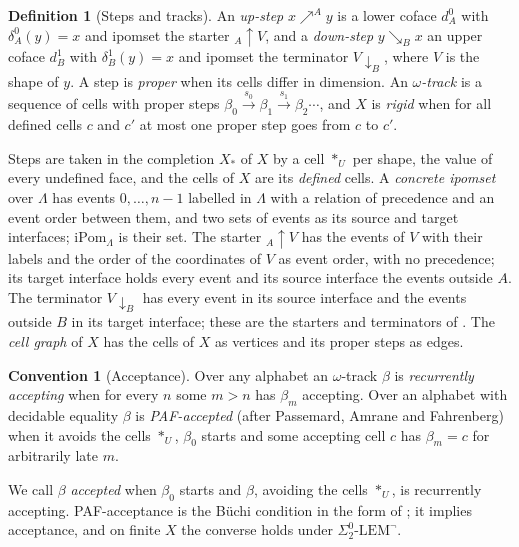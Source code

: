 \documentclass{lmcs}
\theoremstyle{definition}
\newtheorem{definition}[theorem]{Definition}
\newtheorem{convention}[theorem]{Convention}
\theoremstyle{remark}
\newcommand{\arrO}[1]{\mathrel{\nearrow^{#1}}}
\newcommand{\arrI}[1]{\mathrel{\searrow_{#1}}}
\newcommand{\starter}[2]{{}_{#2}{\uparrow}{#1}}
\newcommand{\terminator}[2]{{#1}{\downarrow}_{#2}}%
\newcommand{\Ipom}{\mathrm{iPom}}
\newcommand{\prin}[1]{\mathrm{#1}}
\newcommand{\EIO}{\Sigma^0_2\text{-}\prin{LEM}^{\neg}}
\begin{document}
\begin{definition}[Steps and tracks]\label{def:track}
An \emph{up-step} $x\arrO{A}y$ is a lower coface $d^0_A$ with $\delta^0_A(y)=x$ and ipomset the starter
$\starter{V}{A}$, and a \emph{down-step} $y\arrI{B}x$ an upper coface $d^1_B$ with $\delta^1_B(y)=x$ and
ipomset the terminator $\terminator{V}{B}$, where $V$ is the shape of $y$. A step is \emph{proper} when its
cells differ in dimension. An \emph{$\omega$-track} is a sequence of cells with proper steps
$\beta_0\xrightarrow{s_0}\beta_1\xrightarrow{s_1}\beta_2\cdots$, and $X$ is \emph{rigid} when for all defined cells $c$
and $c'$ at most one proper step goes from $c$ to $c'$.
\end{definition}

Steps are taken in the completion $X_\ast$ of $X$ by a cell $\ast_U$ per shape, the value of every undefined
face, and the cells of $X$ are its \emph{defined} cells. A \emph{concrete ipomset} over $\Lambda$ has events
$0,\dots,n-1$ labelled in $\Lambda$ with a relation of precedence and an event order between them, and two sets of
events as its source and target interfaces; $\Ipom_\Lambda$ is their set. The starter
$\starter{V}{A}$ has the events of $V$ with their labels and the order of the coordinates of $V$ as event order,
with no precedence; its target interface holds every event and its source interface the events outside
$A$. The terminator $\terminator{V}{B}$ has every event in its source interface and
the events outside $B$ in its target interface; these are the starters and
terminators of \cite{FJSZ21,PAF25}.
The \emph{cell graph} of $X$ has the
cells of $X$ as vertices and its proper steps as edges.

\begin{convention}[Acceptance]\label{conv:buchi}
Over any alphabet an $\omega$-track $\beta$ is \emph{recurrently accepting} when for every $n$ some $m>n$ has
$\beta_m$ accepting. Over an alphabet with decidable equality $\beta$ is
\emph{PAF-accepted} (after Passemard, Amrane and Fahrenberg) when it avoids the cells $\ast_U$, $\beta_0$ starts and some accepting cell $c$ has
$\beta_m=c$ for arbitrarily late $m$.
\end{convention}

We call $\beta$ \emph{accepted} when $\beta_0$ starts and $\beta$, avoiding the cells $\ast_U$, is
recurrently accepting. PAF-acceptance is the B\"uchi condition in the form of
\cite{PAF25}; it implies acceptance,
and on finite $X$ the converse holds under $\EIO$.
\end{document}
